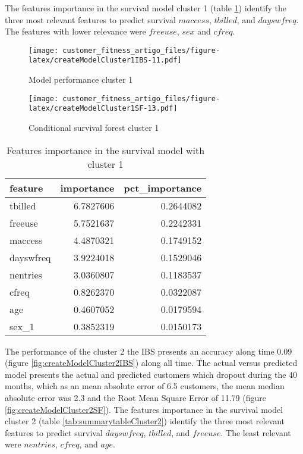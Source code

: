 \documentclass[
  12pt,
]{article}
\begin{document}
The features importance in the survival model cluster 1 (table \ref{tab:summarytableCluster1})
identify the three most relevant features to predict survival \(maccess\),
\(tbilled\), and \(dayswfreq\). The features with lower relevance were \(freeuse\), \(sex\) and \(cfreq\).

\begin{figure}
\centering
\texttt{[image: customer\_fitness\_artigo\_files/figure-latex/createModelCluster1IBS-11.pdf]}
\caption{\label{fig:createModelCluster1IBS}Model performance cluster 1}
\end{figure}

\begin{figure}
\centering
\texttt{[image: customer\_fitness\_artigo\_files/figure-latex/createModelCluster1SF-13.pdf]}
\caption{\label{fig:createModelCluster1SF}Conditional survival forest cluster 1}
\end{figure}

\begin{table}

\caption{\label{tab:summarytableCluster1}Features importance in the survival model with cluster 1}
\centering
\begin{tabular}[t]{lrr}
\toprule
feature & importance & pct\_importance\\
\midrule
tbilled & 6.7827606 & 0.2644082\\
freeuse & 5.7521637 & 0.2242331\\
maccess & 4.4870321 & 0.1749152\\
dayswfreq & 3.9224018 & 0.1529046\\
nentries & 3.0360807 & 0.1183537\\
\addlinespace
cfreq & 0.8262370 & 0.0322087\\
age & 0.4607052 & 0.0179594\\
sex\_1 & 0.3852319 & 0.0150173\\
\bottomrule
\end{tabular}
\end{table}

The performance of the cluster 2 the IBS presents an accuracy along time 0.09
(figure \ref{fig:createModelCluster2IBS}) along all time.
The actual versus predicted model presents the actual and predicted customers which dropout during
the 40 months, which as an mean absolute error of 6.5 customers, the mean median absolute
error was 2.3 and the Root Mean Square Error of 11.79 (figure \ref{fig:createModelCluster2SF}).
The features importance in the survival model cluster 2 (table \ref{tab:summarytableCluster2})
identify the three most relevant features to predict survival \(dayswfreq\),
\(tbilled\), and \(freeuse\). The least relevant were \(nentries\), \(cfreq\), and \(age\).
\end{document}
